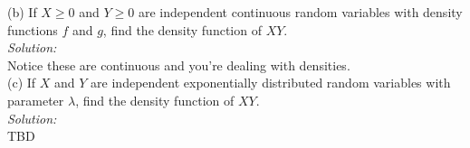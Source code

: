 \documentclass[10pt]{amsart}
\begin{document}
(b) If $X \geq 0$ and $Y \geq 0$ are independent continuous random variables with density functions $f$ and $g$, find the density function of $XY$. \\
\textit{Solution:} \\
Notice these are continuous and you're dealing with densities.
\\

(c) If $X$ and $Y$ are independent exponentially distributed random variables with parameter $\lambda$, find the density function of $XY$.\\
\textit{Solution:} \\
TBD
\\
\end{document}
